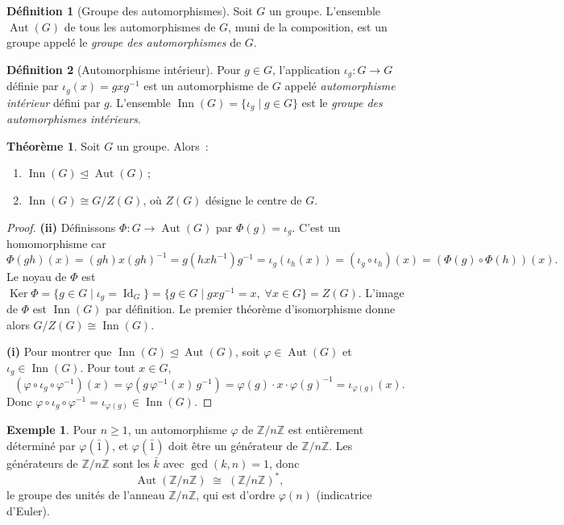 \documentclass[12pt,a4paper,openany]{book}
\theoremstyle{definition}
\newtheorem{definition}{Définition}[chapter]
\newtheorem{theoreme}{Théorème}[chapter]
\newtheorem{exemple}{Exemple}[chapter]
\newcommand{\Z}{\mathbb{Z}}
\DeclareMathOperator{\Aut}{Aut}
\DeclareMathOperator{\Inn}{Inn}
\DeclareMathOperator{\Ker}{Ker}
\DeclareMathOperator{\Id}{Id}
\begin{document}
\begin{definition}[Groupe des automorphismes]\label{def:aut}
  Soit $G$ un groupe. L'ensemble
  $\Aut(G)$
  de tous les automorphismes de $G$, muni de la composition, est un
  groupe appelé le \emph{groupe des automorphismes} de $G$.
\end{definition}

\begin{definition}[Automorphisme intérieur]\label{def:inn}
  Pour $g\in G$, l'application
  $\iota_g\colon G\to G$ définie par $\iota_g(x) = gxg^{-1}$
  est un automorphisme de $G$ appelé \emph{automorphisme
  intérieur} défini par $g$.
  L'ensemble $\Inn(G) = \{\iota_g\mid g\in G\}$ est le
  \emph{groupe des automorphismes intérieurs}.
\end{definition}

\begin{theoreme}\label{thm:inn-normal-aut}
  Soit $G$ un groupe. Alors~:
  \begin{enumerate}[label=(\roman*)]
    \item $\Inn(G)\trianglelefteq\Aut(G)$\,;
    \item $\Inn(G)\cong G/Z(G)$, où $Z(G)$ désigne le centre de $G$.
  \end{enumerate}
\end{theoreme}

\begin{proof}
  \textbf{(ii)} Définissons $\Phi\colon G\to\Aut(G)$ par
  $\Phi(g) = \iota_g$. C'est un homomorphisme car
  \[
    \Phi(gh)(x) = (gh)x(gh)^{-1} = g(hxh^{-1})g^{-1}
    = \iota_g(\iota_h(x)) = (\iota_g\circ\iota_h)(x)
    = (\Phi(g)\circ\Phi(h))(x).
  \]
  Le noyau de $\Phi$ est
  $\Ker\Phi = \{g\in G\mid \iota_g=\Id_G\}
  = \{g\in G\mid gxg^{-1}=x,\;\forall x\in G\} = Z(G)$.
  L'image de $\Phi$ est $\Inn(G)$ par définition.
  Le premier théorème d'isomorphisme donne alors
  $G/Z(G)\cong\Inn(G)$.

  \medskip

  \textbf{(i)} Pour montrer que $\Inn(G)\trianglelefteq\Aut(G)$,
  soit $\varphi\in\Aut(G)$ et $\iota_g\in\Inn(G)$. Pour tout $x\in G$,
  \[
    (\varphi\circ\iota_g\circ\varphi^{-1})(x)
    = \varphi(g\,\varphi^{-1}(x)\,g^{-1})
    = \varphi(g)\cdot x\cdot\varphi(g)^{-1}
    = \iota_{\varphi(g)}(x).
  \]
  Donc $\varphi\circ\iota_g\circ\varphi^{-1} = \iota_{\varphi(g)}\in\Inn(G)$.
\end{proof}

\begin{exemple}\label{ex:aut-Zn}
  Pour $n\geq 1$, un automorphisme $\varphi$ de $\Z/n\Z$ est entièrement
  déterminé par $\varphi(\bar{1})$, et $\varphi(\bar{1})$ doit être un
  générateur de $\Z/n\Z$. Les générateurs de $\Z/n\Z$ sont les
  $\bar{k}$ avec $\gcd(k,n)=1$, donc
  \[
    \Aut(\Z/n\Z) \;\cong\; (\Z/n\Z)^*,
  \]
  le groupe des unités de l'anneau $\Z/n\Z$, qui est d'ordre
  $\varphi(n)$ (indicatrice d'Euler).
\end{exemple}
\end{document}
